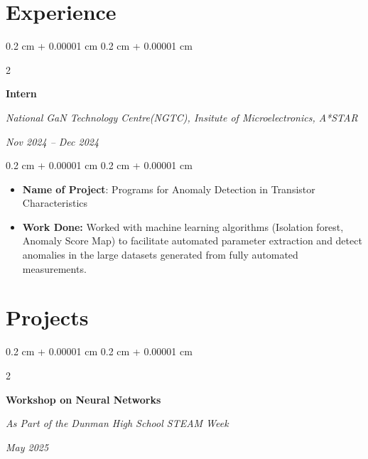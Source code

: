 \documentclass[10pt, letterpaper]{article}
\newenvironment{highlights}{
    \begin{itemize}[
        topsep=0.10 cm,
        parsep=0.10 cm,
        partopsep=0pt,
        itemsep=0pt,
        leftmargin=0.4 cm + 10pt
    ]
}{
    \end{itemize}
} %
\newenvironment{onecolentry}{
    \begin{adjustwidth}{
        0.2 cm + 0.00001 cm
    }{
        0.2 cm + 0.00001 cm
    }
}{
    \end{adjustwidth}
} %
\newenvironment{twocolentry}[2][]{
    \onecolentry
    \def\secondColumn{#2}
    \setcolumnwidth{\fill, 4.5 cm}
    \begin{paracol}{2}
}{
    \switchcolumn \raggedleft \secondColumn
    \end{paracol}
    \endonecolentry
} %
\begin{document}
        






        

        

        

      




        
  

    
   \section{Experience}



        
        \begin{twocolentry}{
            
            
        \textit{Nov 2024 – Dec 2024}}
            \textbf{Intern}

            \textit{National GaN Technology Centre(NGTC), Insitute of Microelectronics, A*STAR}
        \end{twocolentry}

        \vspace{0.10 cm}
        \begin{onecolentry}
            \begin{highlights}
                \item \textbf{Name of Project}: Programs for Anomaly Detection in Transistor Characteristics
                \item \textbf{Work Done:} Worked with machine learning algorithms (Isolation forest, Anomaly Score Map) to facilitate automated parameter extraction and detect anomalies in the large datasets generated from fully automated measurements.
            \end{highlights}
        \end{onecolentry}
\newpage
 \section{Projects}



        
        \begin{twocolentry}{
            
            
        \textit{May 2025}}
            \textbf{Workshop on Neural Networks}

            \textit{As Part of the Dunman High School STEAM Week}
        \end{twocolentry}
\end{document}
